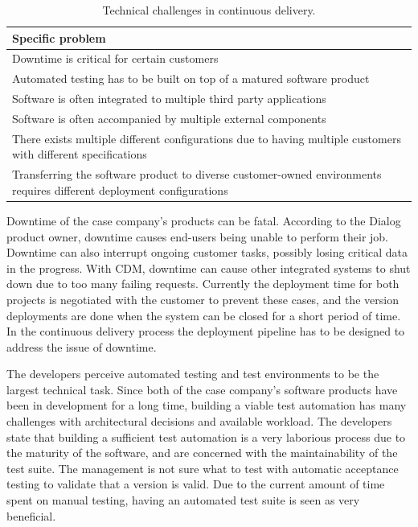 \documentclass[english]{tktltiki2}
\theoremstyle{definition}
\theoremstyle{remark}
\begin{document}
\begin{center}
\begin{table}[htb]
    \begin{tabular}{ | p{12cm} |}
    \hline
    \textbf{Specific problem} \\ \hline
    Downtime is critical for certain customers \\ \hline
    Automated testing has to be built on top of a matured software product \\ \hline
    Software is often integrated to multiple third party applications \\ \hline
    Software is often accompanied by multiple external components \\ \hline
    There exists multiple different configurations due to having multiple customers with different specifications \\ \hline
    Transferring the software product to diverse customer-owned environments requires different deployment configurations \\ 
    \hline
    \end{tabular}
    \caption{Technical challenges in continuous delivery.}
    \end{table}
\end{center}
Downtime of the case company's products can be fatal. According to the Dialog product owner, downtime causes end-users being unable to perform their job. Downtime can also interrupt ongoing customer tasks, possibly losing critical data in the progress. With CDM, downtime can cause other integrated systems to shut down due to too many failing requests. Currently the deployment time for both projects is negotiated with the customer to prevent these cases, and the version deployments are done when the system can be closed for a short period of time. In the continuous delivery process the deployment pipeline has to be designed to address the issue of downtime.

The developers perceive automated testing and test environments to be the largest technical task. Since both of the case company's software products have been in development for a long time, building a viable test automation has many challenges with architectural decisions and available workload. The developers state that building a sufficient test automation is a very laborious process due to the maturity of the software, and are concerned with the maintainability of the test suite. The management is not sure what to test with automatic acceptance testing to validate that a version is valid. Due to the current amount of time spent on manual testing, having an automated test suite is seen as very beneficial.
\end{document}
